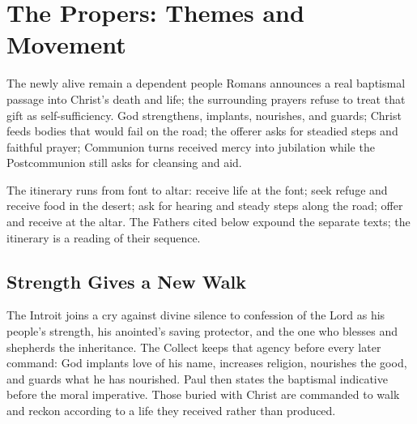 \section*{The Propers: Themes and Movement}

\begin{massbox}{The newly alive remain a dependent people}
Romans announces a real baptismal passage into Christ's death and life; the surrounding prayers refuse to treat that gift as self-sufficiency. God strengthens, implants, nourishes, and guards; Christ feeds bodies that would fail on the road; the offerer asks for steadied steps and faithful prayer; Communion turns received mercy into jubilation while the Postcommunion still asks for cleansing and aid.
\end{massbox}

\begin{center}
\end{center}

\noindent The itinerary runs from font to altar: receive life at the font; seek refuge and receive food in the desert; ask for hearing and steady steps along the road; offer and receive at the altar. The Fathers cited below expound the separate texts; the itinerary is a reading of their sequence.

\sectionguard
\subsection*{Strength Gives a New Walk\enspace{}}

The Introit joins a cry against divine silence to confession of the Lord as his people's strength, his anointed's saving protector, and the one who blesses and shepherds the inheritance. The Collect keeps that agency before every later command: God implants love of his name, increases religion, nourishes the good, and guards what he has nourished. Paul then states the baptismal indicative before the moral imperative. Those buried with Christ are commanded to walk and reckon according to a life they received rather than produced.

